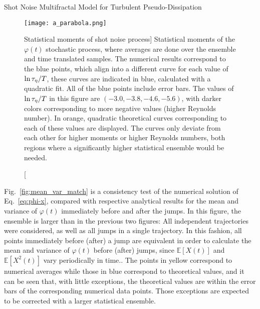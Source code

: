 \begin{chapter}{Shot Noise Multifractal Model for Turbulent Pseudo-Dissipation}
\begin{figure}[ht]
    \centering
    \texttt{[image: a\_parabola.png]}
    \caption
    [Statistical moments of shot noise process]
    {Statistical moments of the $\varphi(t)$ stochastic process, where averages are done over the ensemble and time translated samples. The numerical results correspond to the blue points, which align into a different curve for each value of $\ln \tau_{\eta}/T$, these curves are indicated in blue, calculated with a quadratic fit. All of the blue points include error bars. The values of $\ln\tau_{\eta}/T$ in this figure are $(-3.0,-3.8,-4.6,-5.6)$, with darker colors corresponding to more negative values (higher Reynolds number). In orange, quadratic theoretical curves corresponding to each of these values are displayed.
    The curves only deviate from each other for higher moments or higher Reynolds numbers, both regions where a significantly higher statistical ensemble would be needed.}
    \label{fig:parabola}
\end{figure}

Fig.~\ref{fig:mean_var_match} is a consistency test of the numerical solution of Eq.~\eqref{eq:phi-x}, compared with respective analytical results for the mean and variance of $\varphi(t)$ immediately before and after the jumps.
In this figure, the ensemble is larger than in the previous two figures: All independent trajectories were considered, as well as all jumps in a single trajectory. In this fashion, all points immediately before (after) a jump are equivalent in order to calculate the mean and variance of $\varphi(t)$ before (after) jumps, since $\mathbb{E}[X(t)]$ and $\mathbb{E}[X^2(t)]$ vary periodically in time.. The points in yellow correspond to numerical averages while those in blue correspond to theoretical values, and it can be seen that, with little exceptions, the theoretical values are within the error bars of the corresponding numerical data points. Those exceptions are expected to be corrected with a larger statistical ensemble.


\end{chapter}

